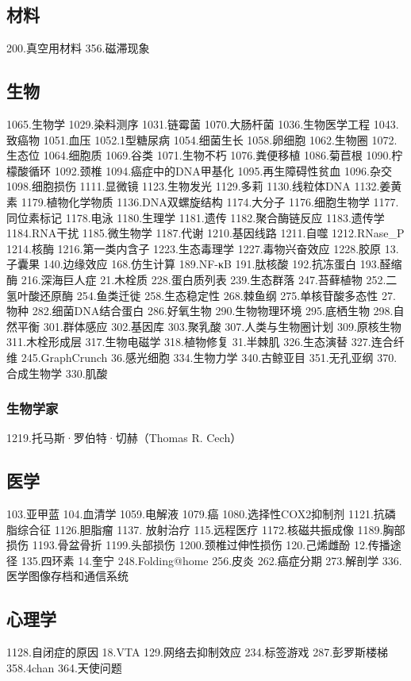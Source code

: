 \subsection{材料}
200.真空用材料
356.磁滞现象
\subsection{生物}
1065.生物学
1029.染料测序
1031.链霉菌
1070.大肠杆菌
1036.生物医学工程
1043.致癌物
1051.血压
1052.1型糖尿病
1054.细菌生长
1058.卵细胞
1062.生物圈
1072.生态位
1064.细胞质
1069.谷类
1071.生物不朽
1076.粪便移植
1086.菊苣根
1090.柠檬酸循环
1092.颈椎
1094.癌症中的DNA甲基化
1095.再生障碍性贫血
1096.杂交
1098.细胞损伤
1111.显微镜
1123.生物发光
1129.多莉
1130.线粒体DNA
1132.姜黄素
1179.植物化学物质
1136.DNA双螺旋结构
1174.大分子
1176.细胞生物学
1177.同位素标记
1178.电泳
1180.生理学
1181.遗传
1182.聚合酶链反应
1183.遗传学
1184.RNA干扰
1185.微生物学
1187.代谢
1210.基因线路
1211.自噬
1212.RNase_P
1214.核酶
1216.第一类内含子
1223.生态毒理学
1227.毒物兴奋效应
1228.胶原
13.子囊果
140.边缘效应
168.仿生计算
189.NF-κB
191.肽核酸
192.抗冻蛋白
193.醛缩酶
216.深海巨人症
21.木栓质
228.蛋白质列表
239.生态群落
247.苔藓植物
252.二氢叶酸还原酶
254.鱼类迁徙
258.生态稳定性
268.棘鱼纲
275.单核苷酸多态性
27.物种
282.细菌DNA结合蛋白
286.好氧生物
290.生物物理环境
295.底栖生物
298.自然平衡
301.群体感应
302.基因库
303.聚乳酸
307.人类与生物圈计划
309.原核生物
311.木栓形成层
317.生物电磁学
318.植物修复
31.半棘肌
326.生态演替
327.连合纤维
245.GraphCrunch
36.感光细胞
334.生物力学
340.古鲸亚目
351.无孔亚纲
370.合成生物学
330.肌酸

\subsubsection{生物学家}
1219.托马斯·罗伯特·切赫（Thomas R. Cech）

\subsection{医学}
103.亚甲蓝
104.血清学
1059.电解液
1079.癌
1080.选择性COX2抑制剂
1121.抗磷脂综合征
1126.胆脂瘤
1137. 放射治疗
115.远程医疗
1172.核磁共振成像
1189.胸部损伤
1193.骨盆骨折
1199.头部损伤
1200.颈椎过伸性损伤
120.己烯雌酚
12.传播途径
135.四环素
14.奎宁
248.Folding@home
256.皮炎
262.癌症分期
273.解剖学
336.医学图像存档和通信系统

\subsection{心理学}
1128.自闭症的原因
18.VTA
129.网络去抑制效应
234.标签游戏
287.彭罗斯楼梯
358.4chan
364.天使问题

